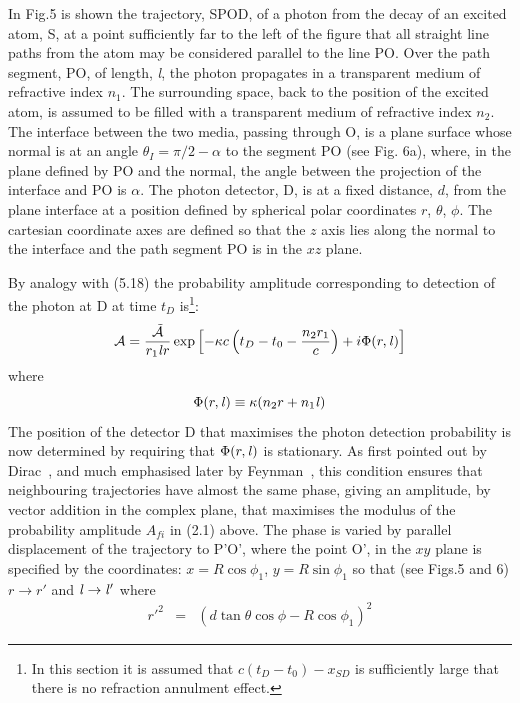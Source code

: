 \documentclass [12pt]{article}
\begin{document}
{  In Fig.5 is shown the trajectory, SPOD, of a photon from the decay of an excited atom, S,
  at a point sufficiently far to the left of the figure that all straight line paths
  from the atom may be considered parallel to the line PO. Over the path segment, PO,
   of length, {\it l}, the photon propagates in a transparent medium of
   refractive index $n_1$. The surrounding space, back to the position of the excited atom, is 
    assumed to be filled with a transparent medium of refractive index $n_2$. The interface
 between the two media, passing through O, is a plane surface whose normal is at an angle
 $\theta_I = \pi/2-\alpha$ to the segment PO (see Fig. 6a), where, in the plane
  defined by PO and the normal, the angle between the projection of the interface and PO is
   $\alpha$. The photon detector, D,  is at a fixed distance,
  $d$, from the plane interface at a position defined by spherical polar coordinates $r$, $\theta$, $\phi$.
 The cartesian coordinate axes are defined so that the
  $z$ axis lies along the normal to the interface and the path segment PO is in the
  $xz$ plane.
 \par By analogy with (5.18) the probability amplitude corresponding to detection of the
  photon at D at time $t_D$ is\footnote{ In this section it is assumed that $c(t_D-t_0) -x_{SD}$
  is sufficiently large that there is no refraction annulment effect.}:
   \begin{equation}
{\cal A }    =  \frac{\tilde{\cal A}}{r_1 {\it l} r }
   \exp\left[ -\kappa c \left(t_D-t_0- \frac{n_2 r_1}{c}\right)+ i\Phi(r,{\it l}) \right]
 \end{equation}
    where
   \[ \Phi(r,{\it l}) \equiv \kappa (n_2 r +n_1 {\it l}) \] 
   The position of the detector D that maximises the photon detection probability is now determined by
  requiring that $ \Phi(r,{\it l})$ is stationary. As first pointed out by
   Dirac~\cite{Dirac2}, and much emphasised later by Feynman~\cite{Feyn5}, this condition ensures
   that neighbouring trajectories have almost the same phase, giving an amplitude, by vector addition
   in the complex plane, that maximises the modulus of the probability
   amplitude $A_{fi}$ in (2.1) above. 
   The phase is varied by parallel displacement of the trajectory to P'O',
   where the point O', in the $xy$ plane is specified by the coordinates: $x = R \cos \phi_1$,
   $y = R \sin \phi_1$ so that (see Figs.5 and 6) $r \rightarrow r'$ and ${\it l} \rightarrow {\it l}'$ where
  \begin{eqnarray}
   r'^2 & = & (d \tan \theta \cos \phi -R \cos \phi_1)^2

\end{eqnarray}}
\end{document}
